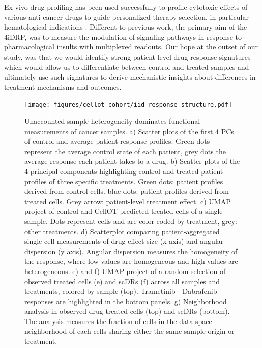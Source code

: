 
Ex-vivo drug profiling has been used successfully to profile cytotoxic effects of various anti-cancer drugs to guide personalized therapy selection, in particular hematological indications \cite{liebers2023, kropivsek2023}.
Different to previous work, the primary aim of the 4iDRP, was to measure the modulation of signaling pathways in response to pharmacological insults with multiplexed readouts.
Our hope at the outset of our study, was that we would identify strong patient-level drug response signatures which would allow us to differentiate between control and treated samples and ultimately use such signatures to derive mechanistic insights about differences in treatment mechanisms and outcomes.  

\begin{figure}[htp!]
  \begin{center}
    \texttt{[image: figures/cellot-cohort/iid-response-structure.pdf]}
  \end{center}
  \caption{Unaccounted sample heterogeneity dominates functional measurements of cancer samples. a) Scatter plots of the first 4 PCs of control and average patient response profiles. Green dots represent the average control state of each patient, grey dots the average response each patient takes to a drug.
  b) Scatter plots of the 4 principal components highlighting control and treated patient profiles of three specific treatments. Green dots: patient profiles derived from control cells. blue dots: patient profiles derived from treated cells. Grey arrow: patient-level treatment effect.
  c) UMAP project of control and CellOT-predicted treated cells of a single sample. Dots represent cells and are color-coded by treatment, grey: other treatments.
  d) Scatterplot comparing patient-aggregated single-cell measurements of drug effect size (x axis) and angular dispersion (y axis). Angular dispersion measures the homogeneity of the response, where low values are homogeneous and high values are heterogeneous.
  e) and f) UMAP project of a random selection of observed treated cells (e) and scDRs (f) across all samples and treatments, colored by sample (top). Trametinib - Dabrafenib responses are highlighted in the bottom panels.
  g) Neighborhood analysis in observed drug treated cells (top) and scDRs (bottom). The analysis measures the fraction of cells in the data space neighborhood of each cells sharing either the same sample origin or treatment.
 }
  \label{fig:iid-structure}
\end{figure}

